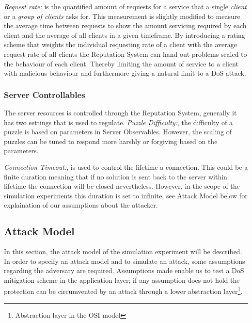 \emph{Request rate:} is the quantified amount of requests for a service that a single \emph{client} or a \emph{group of clients} asks for. This measurement is slightly modified to measure the average time between requests to show the amount servicing required by each client and the average of all clients in a given timeframe. By introducing a rating scheme that weights the individual requesting rate of a client with the average request rate of all clients the Reputation System can hand out problems scaled to the behaviour of each client. Thereby limiting the amount of service to a client with malicious behaviour and furthermore giving a natural limit to a DoS attack.


\subsubsection{Server Controllables}
The server resources is controlled through the Reputation System, generally it has two settings that is used to regulate.
\emph{Puzzle Difficulty:}, the difficulty of a puzzle is based on parameters in Server Observables. However, the scaling of puzzles can be tuned to respond more harshly or forgiving based on the parameters.

\emph{Connection Timeout:}, is used to control the lifetime a connection. This could be a finite duration meaning that if no solution is sent back to the server within lifetime the connection will be closed nevertheless.
However, in the scope of the simulation experiments this duration is set to infinite, see Attack Model below for explaination of our assumptions about the attacker. 
\subsection{Attack Model}
In this section, the attack model of the simulation experiment will be described.
In order to specify an attack model and to simulate an attack, some assumptions regarding the adversary are required.
Assumptions made enable us to test a DoS mitigation scheme in the application layer; if any assumption does not hold the protection can be circumvented by an attack through a lower abstraction layer\footnote{Abstraction layer in the OSI model}. 

